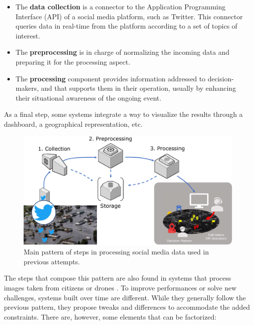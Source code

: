 \begin{itemize}
    \item The \textbf{data collection} is a connector to the Application Programming Interface (API) of a
          social media platform, such as Twitter.
          This connector queries data in real-time from the platform according to a set of topics of interest.
    \item The \textbf{preprocessing} is in charge of normalizing the incoming data and preparing it for the processing aspect.
    \item The \textbf{processing} component provides information addressed to decision-makers, and that supports them in their operation, usually by enhancing their situational awareness of the ongoing event.
\end{itemize}

As a final step, some systems integrate a way to visualize the results through a dashboard, a geographical representation, etc.

\begin{figure}[htb]
    \centering
    \includegraphics[width=\textwidth]{figures/chap-5/social-media-processing.pdf}
    \caption{Main pattern of steps in processing social media data used in previous attempts.}
    \label{system:sm-processing}
\end{figure}

The steps that compose this pattern are also found in systems that process images taken from citizens \parencite{alamImage4ActOnlineSocial2017} or drones \parencite{fanDisasterCityDigital2021}.
To improve performances or solve new challenges, systems built over time are different.
While they generally follow the previous pattern, they propose tweaks and differences to accommodate the added constraints.
There are, however, some elements that can be factorized:

